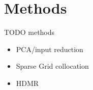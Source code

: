 \section{Methods}
TODO methods
\begin{itemize}
  \item PCA/input reduction
  \item Sparse Grid collocation
  \item HDMR
\end{itemize}

